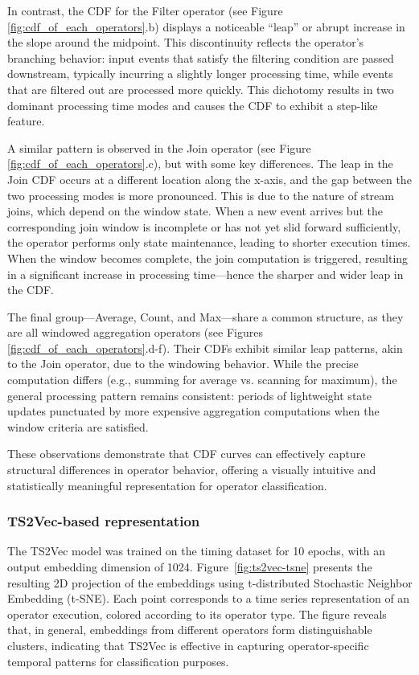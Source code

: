 In contrast, the CDF for the Filter operator (see Figure \ref{fig:cdf_of_each_operators}.b) displays a noticeable “leap” or abrupt increase in the slope around the midpoint. This discontinuity reflects the operator's branching behavior: input events that satisfy the filtering condition are passed downstream, typically incurring a slightly longer processing time, while events that are filtered out are processed more quickly. This dichotomy results in two dominant processing time modes and causes the CDF to exhibit a step-like feature.

A similar pattern is observed in the Join operator (see Figure \ref{fig:cdf_of_each_operators}.c), but with some key differences. 
%
The leap in the Join CDF occurs at a different location along the x-axis, and the gap between the two processing modes is more pronounced. 
%
This is due to the nature of stream joins, which depend on the window state. When a new event arrives but the corresponding join window is incomplete or has not yet slid forward sufficiently, the operator performs only state maintenance, leading to shorter execution times. When the window becomes complete, the join computation is triggered, resulting in a significant increase in processing time—hence the sharper and wider leap in the CDF.

The final group—Average, Count, and Max—share a common structure, as they are all windowed aggregation operators (see Figures \ref{fig:cdf_of_each_operators}.d-f). 
%
Their CDFs exhibit similar leap patterns, akin to the Join operator, due to the windowing behavior. 
%
While the precise computation differs (e.g., summing for average vs. scanning for maximum), the general processing pattern remains consistent: periods of lightweight state updates punctuated by more expensive aggregation computations when the window criteria are satisfied.

These observations demonstrate that CDF curves can effectively capture structural differences in operator behavior, offering a visually intuitive and statistically meaningful representation for operator classification.

\subsubsection{TS2Vec-based representation} The TS2Vec model was trained on the timing dataset for 10 epochs, with an output embedding dimension of 1024. 
%
Figure~\ref{fig:ts2vec-tsne} presents the resulting 2D projection of the embeddings using t-distributed Stochastic Neighbor Embedding (t-SNE). Each point corresponds to a time series representation of an operator execution, colored according to its operator type. The figure reveals that, in general, embeddings from different operators form distinguishable clusters, indicating that TS2Vec is effective in capturing operator-specific temporal patterns for classification purposes.

